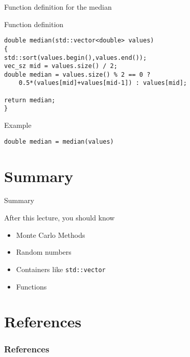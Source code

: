 \documentclass[12pt]{beamer}
\begin{document}
\begin{frame}[fragile]{Function definition for the median}

\begin{block}{Function definition}
\begin{lstlisting}
double median(std::vector<double> values)
{
std::sort(values.begin(),values.end());
vec_sz mid = values.size() / 2;
double median = values.size() % 2 == 0 ? 
    0.5*(values[mid]+values[mid-1]) : values[mid];
    
return median;
}
\end{lstlisting}
\end{block}

\begin{block}{Example}

\lstinline|double median = median(values)|

\end{block}

\end{frame}

\section{Summary}

\begin{frame}{Summary}
\begin{block}{After this lecture, you should know}
\begin{itemize}
\item Monte Carlo Methods
\item Random numbers
\item Containers like \lstinline|std::vector|
\item Functions
\end{itemize}

\end{block}


\end{frame}

\section{References}

\begin{frame}[t, allowframebreaks]
\frametitle{References}


\end{frame}
\end{document}
